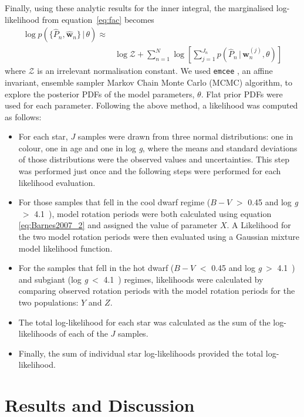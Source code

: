 \documentclass[useAMS, usenatbib]{mn2e}
\newcommand{\logg}{log \emph{g}}
\newcommand{\w}{\mathbf{w}}
\newcommand{\subcut}{4.1~}
\begin{document}
Finally, using these analytic results for the inner integral, the
marginalised log-likelihood from equation~\ref{eq:fac} becomes
\begin{eqnarray}
	\log p(\{\hat{P}_n,\hat{\w}_n\}\,|\,\theta) \approx & \\ \nonumber
    & \log \mathcal{Z} + \sum_{n=1}^N
	\log \left[ \sum_{j=1}^{J_n}p(\hat{P}_n\,|\,\mathbf{w}_n^{(j)},
\theta) \right ]
\end{eqnarray}
where $\mathcal{Z}$ is an irrelevant normalisation constant.
We used {\tt emcee} \citep{Foreman-Mackey2013}, an affine invariant, ensemble
sampler Markov Chain Monte Carlo (MCMC) algorithm, to explore the posterior
PDFs of the model parameters, $\theta$.
Flat prior PDFs were used for each parameter.
Following the above method, a likelihood was computed as follows:
\begin{itemize}
	\item For each star, $J$ samples were drawn from three normal
		distributions: one in colour, one in age and one in \logg,
		where the means and standard deviations of those distributions
		were the observed values and uncertainties.
		This step was performed just once and the
		following steps were performed for each likelihood evaluation.
	\item For those samples that fell in the cool dwarf regime
		($B-V$ $>$ 0.45 and \logg$~>$ \subcut), model rotation
		periods were both calculated using equation
		\ref{eq:Barnes2007_2} and assigned the value of parameter $X$.
		A Likelihood for the two model rotation periods were then
		evaluated using a Gaussian mixture model
		likelihood function.
	\item For the samples that fell in the hot dwarf ($B-V$ $<$ 0.45 and
		\logg$~>$ \subcut) and subgiant (\logg$~<$ \subcut) regimes,
		likelihoods were calculated by comparing observed rotation
		periods with the model rotation periods for the two
		populations: $Y$ and $Z$.
	\item The total log-likelihood for each star was calculated as the
		sum of the log-likelihoods of each of the $J$ samples.
	\item Finally, the sum of individual star log-likelihoods
		provided the total log-likelihood.
\end{itemize}

\section{Results and Discussion}
\label{sec:results}
\end{document}
